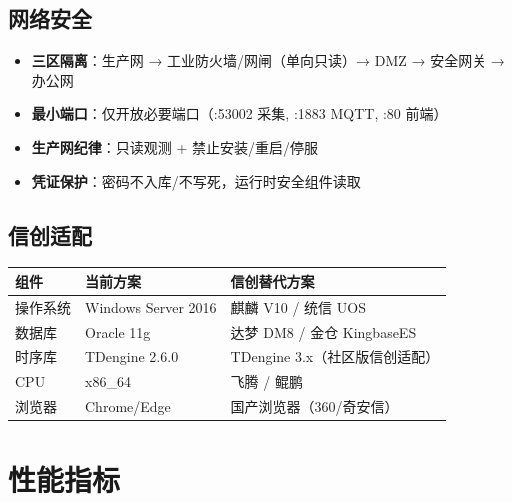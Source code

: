 \documentclass[11pt,a4paper]{ctexart}
\begin{document}
\subsection{网络安全}

\begin{itemize}[leftmargin=*]
  \item \textbf{三区隔离}：生产网 → 工业防火墙/网闸（单向只读）→ DMZ → 安全网关 → 办公网
  \item \textbf{最小端口}：仅开放必要端口（:53002 采集, :1883 MQTT, :80 前端）
  \item \textbf{生产网纪律}：只读观测 + 禁止安装/重启/停服
  \item \textbf{凭证保护}：密码不入库/不写死，运行时安全组件读取
\end{itemize}

\subsection{信创适配}

\begin{table}[H]\centering
\begin{tabular}{p{3.0cm} p{3.5cm} p{3.5cm}}
\toprule
\textbf{组件} & \textbf{当前方案} & \textbf{信创替代方案} \\
\midrule
操作系统 & Windows Server 2016 & 麒麟 V10 / 统信 UOS \\
数据库 & Oracle 11g & 达梦 DM8 / 金仓 KingbaseES \\
时序库 & TDengine 2.6.0 & TDengine 3.x（社区版信创适配） \\
CPU & x86\_64 & 飞腾 / 鲲鹏 \\
浏览器 & Chrome/Edge & 国产浏览器（360/奇安信） \\
\bottomrule
\end{tabular}
\end{table}

\section{性能指标}
\end{document}
